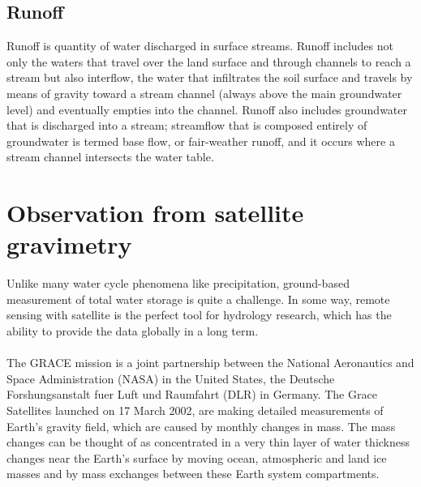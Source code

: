\subsection{Runoff}
Runoff is quantity of water discharged in surface streams. Runoff includes not only the waters that travel over the land surface and through channels to reach a stream but also interflow, the water that infiltrates the soil surface and travels by means of gravity toward a stream channel (always above the main groundwater level) and eventually empties into the channel. Runoff also includes groundwater that is discharged into a stream; streamflow that is composed entirely of groundwater is termed base flow, or fair-weather runoff, and it occurs where a stream channel intersects the water table.
\section{Observation from satellite gravimetry}
Unlike many water cycle phenomena like precipitation, ground-based measurement of total water storage is quite a challenge. In some way, remote sensing with satellite is the perfect tool for hydrology research, which has the ability to provide the data globally in a long term.\\\\
The GRACE mission is a joint partnership between the National Aeronautics and Space Administration (NASA) in the United States, the Deutsche Forshungsanstalt fuer Luft und Raumfahrt (DLR) in Germany. The Grace Satellites launched on 17 March 2002, are making detailed measurements of Earth's gravity field, which are caused by monthly changes in mass. \cite{tapley2004grace} The mass changes can be thought of as concentrated in a very thin layer of water thickness changes near the Earth's surface by moving ocean, atmospheric and land ice masses and by mass exchanges between these Earth system compartments.\cite{graceoverview} \\\\

